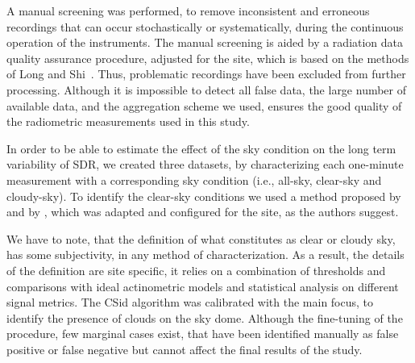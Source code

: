 \documentclass[An awesome
journal,,,moreauthors,pdftex]{Definitions/mdpi}
\begin{document}
A manual screening was performed, to remove inconsistent and erroneous
recordings that can occur stochastically or systematically, during the
continuous operation of the instruments. The manual screening is aided
by a radiation data quality assurance procedure, adjusted for the site,
which is based on the methods of Long and
Shi~\citetext{\citeyear{Long2008a}; \citeyear{Long2006}}. Thus,
problematic recordings have been excluded from further processing.
Although it is impossible to detect all false data, the large number of
available data, and the aggregation scheme we used, ensures the good
quality of the radiometric measurements used in this study.

In order to be able to estimate the effect of the sky condition on the
long term variability of SDR, we created three datasets, by
characterizing each one-minute measurement with a corresponding sky
condition (i.e., all-sky, clear-sky and cloudy-sky). To identify the
clear-sky conditions we used a method proposed by \citet{Long2000} and
by \citet{Reno2016}, which was adapted and configured for the site, as
the authors suggest.

We have to note, that the definition of what constitutes as clear or
cloudy sky, has some subjectivity, in any method of characterization. As
a result, the details of the definition are site specific, it relies on
a combination of thresholds and comparisons with ideal actinometric
models and statistical analysis on different signal metrics. The CSid
algorithm was calibrated with the main focus, to identify the presence
of clouds on the sky dome. Although the fine-tuning of the procedure,
few marginal cases exist, that have been identified manually as false
positive or false negative but cannot affect the final results of the
study.
\end{document}
